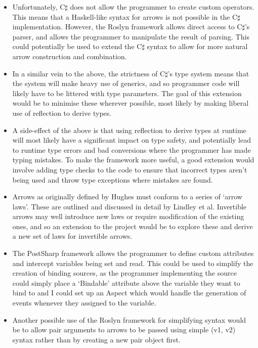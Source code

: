 		\begin{itemize}
			\item Unfortunately, C$\sharp$ does not allow the programmer to create custom operators. This means that a Haskell-like syntax for arrows is not possible in the C$\sharp$ implementation. However, the Roslyn framework allows direct access to C$\sharp$'s parser, and allows the programmer to manipulate the result of parsing. This could potentially be used to extend the C$\sharp$ syntax to allow for more natural arrow construction and combination.
			
			\item In a similar vein to the above, the strictness of C$\sharp$'s type system means that the system will make heavy use of generics, and so programmer code will likely have to be littered with type parameters. The goal of this extension would be to minimise these wherever possible, most likely by making liberal use of reflection to derive types.
			
			\item A side-effect of the above is that using reflection to derive types at runtime will most likely have a significant impact on type safety, and potentially lead to runtime type errors and bad conversions where the programmer has made typing mistakes. To make the framework more useful, a good extension would involve adding type checks to the code to ensure that incorrect types aren't being used and throw type exceptions where mistakes are found.
			
			\item Arrows as originally defined by Hughes\cite{hughes98} must conform to a series of `arrow laws'. These are outlined and discussed in detail by Lindley et al\cite{lindley08}. Invertible arrows may well introduce new laws or require modification of the existing ones, and so an extension to the project would be to explore these and derive a new set of laws for invertible arrows.
			
			\item The PostSharp\cite{postsharp} framework allows the programmer to define custom attributes and intercept variables being set and read. This could be used to simplify the creation of binding sources, as the programmer implementing the source could simply place a `Bindable' attribute above the variable they want to bind to and I could set up an Aspect which would handle the generation of events whenever they assigned to the variable.
			
			\item Another possible use of the Roslyn framework for simplifying syntax would be to allow pair arguments to arrows to be passed using simple (v1, v2) syntax rather than by creating a new pair object first.
		\end{itemize}

